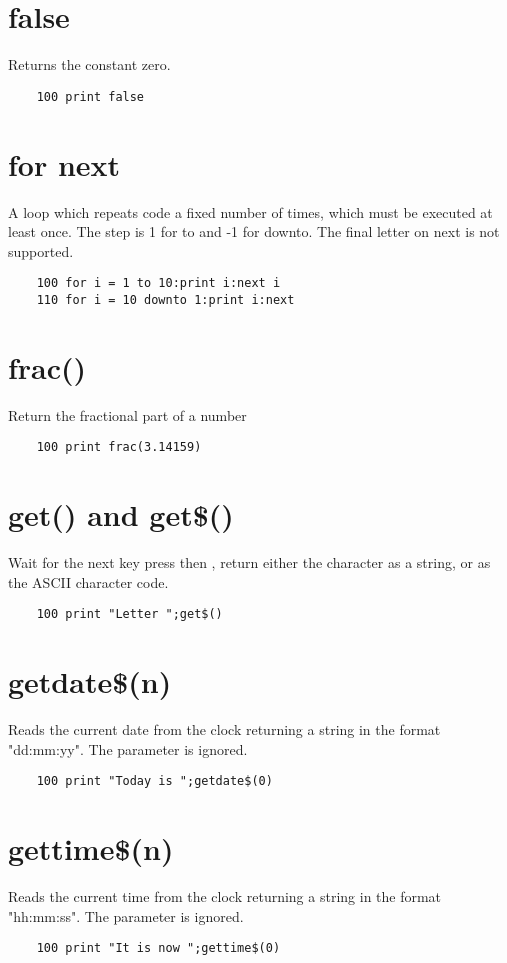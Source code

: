 \section*{false}
Returns the constant zero.
\example{}
\begin{verbatim}
	100 print false
\end{verbatim}

\section*{for next}
A loop which repeats code a fixed number of times, which must be executed at least once. The step is 1 for to and -1 for downto. The final letter on next is not supported.
\example{}
\begin{verbatim}
	100 for i = 1 to 10:print i:next i
	110 for i = 10 downto 1:print i:next
\end{verbatim}

\section*{frac()}
Return the fractional part of a number
\example{}
\begin{verbatim}
	100 print frac(3.14159)
\end{verbatim}

\section*{get() and get\$()}
Wait for the next key press then , return either the character as a string, or as the ASCII character code. 
\example{}
\begin{verbatim}
	100 print "Letter ";get$()
\end{verbatim}

\section*{getdate\$(n)}
Reads the current date from the clock returning a string in the format "dd:mm:yy". The parameter is ignored.
\example{}
\begin{verbatim}
	100 print "Today is ";getdate$(0)
\end{verbatim}

\section*{gettime\$(n)}
Reads the current time from the clock returning a string in the format "hh:mm:ss". The parameter is ignored.
\example{}
\begin{verbatim}
	100 print "It is now ";gettime$(0)
\end{verbatim}

